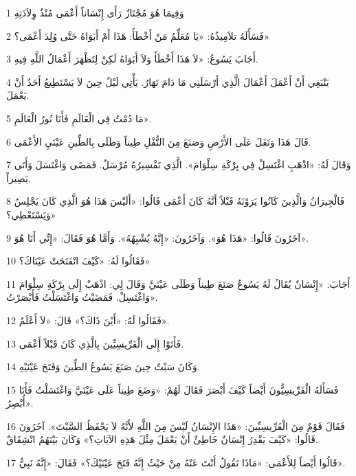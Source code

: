 \par 1 وَفِيمَا هُوَ مُجْتَازٌ رَأَى إِنْسَاناً أَعْمَى مُنْذُ وِلاَدَتِهِ
\par 2 فَسَأَلَهُ تلاَمِيذُهُ: «يَا مُعَلِّمُ مَنْ أَخْطَأَ: هَذَا أَمْ أَبَوَاهُ حَتَّى وُلِدَ أَعْمَى؟»
\par 3 أَجَابَ يَسُوعُ: «لاَ هَذَا أَخْطَأَ وَلاَ أَبَوَاهُ لَكِنْ لِتَظْهَرَ أَعْمَالُ اللَّهِ فِيهِ.
\par 4 يَنْبَغِي أَنْ أَعْمَلَ أَعْمَالَ الَّذِي أَرْسَلَنِي مَا دَامَ نَهَارٌ. يَأْتِي لَيْلٌ حِينَ لاَ يَسْتَطِيعُ أَحَدٌ أَنْ يَعْمَلَ.
\par 5 مَا دُمْتُ فِي الْعَالَمِ فَأَنَا نُورُ الْعَالَمِ».
\par 6 قَالَ هَذَا وَتَفَلَ عَلَى الأَرْضِ وَصَنَعَ مِنَ التُّفْلِ طِيناً وَطَلَى بِالطِّينِ عَيْنَيِ الأَعْمَى.
\par 7 وَقَالَ لَهُ: «اذْهَبِ اغْتَسِلْ فِي بِرْكَةِ سِلْوَامَ». الَّذِي تَفْسِيرُهُ مُرْسَلٌ. فَمَضَى وَاغْتَسَلَ وَأَتَى بَصِيراً.
\par 8 فَالْجِيرَانُ وَالَّذِينَ كَانُوا يَرَوْنَهُ قَبْلاً أَنَّهُ كَانَ أَعْمَى قَالُوا: «أَلَيْسَ هَذَا هُوَ الَّذِي كَانَ يَجْلِسُ وَيَسْتَعْطِي؟»
\par 9 آخَرُونَ قَالُوا: «هَذَا هُوَ». وَآخَرُونَ: «إِنَّهُ يُشْبِهُهُ». وَأَمَّا هُوَ فَقَالَ: «إِنِّي أَنَا هُوَ».
\par 10 فَقَالُوا لَهُ: «كَيْفَ انْفَتَحَتْ عَيْنَاكَ؟»
\par 11 أَجَابَ: «إِنْسَانٌ يُقَالُ لَهُ يَسُوعُ صَنَعَ طِيناً وَطَلَى عَيْنَيَّ وَقَالَ لِي: اذْهَبْ إِلَى بِرْكَةِ سِلْوَامَ وَاغْتَسِلْ. فَمَضَيْتُ وَاغْتَسَلْتُ فَأَبْصَرْتُ».
\par 12 فَقَالُوا لَهُ: «أَيْنَ ذَاكَ؟» قَالَ: «لاَ أَعْلَمُ».
\par 13 فَأَتَوْا إِلَى الْفَرِّيسِيِّينَ بِالَّذِي كَانَ قَبْلاً أَعْمَى.
\par 14 وَكَانَ سَبْتٌ حِينَ صَنَعَ يَسُوعُ الطِّينَ وَفَتَحَ عَيْنَيْهِ.
\par 15 فَسَأَلَهُ الْفَرِّيسِيُّونَ أَيْضاً كَيْفَ أَبْصَرَ فَقَالَ لَهُمْ: «وَضَعَ طِيناً عَلَى عَيْنَيَّ وَاغْتَسَلْتُ فَأَنَا أُبْصِرُ».
\par 16 فَقَالَ قَوْمٌ مِنَ الْفَرِّيسِيِّينَ: «هَذَا الإِنْسَانُ لَيْسَ مِنَ اللَّهِ لأَنَّهُ لاَ يَحْفَظُ السَّبْتَ». آخَرُونَ قَالُوا: «كَيْفَ يَقْدِرُ إِنْسَانٌ خَاطِئٌ أَنْ يَعْمَلَ مِثْلَ هَذِهِ الآيَاتِ؟» وَكَانَ بَيْنَهُمُ انْشِقَاقٌ.
\par 17 قَالُوا أَيْضاً لِلأَعْمَى: «مَاذَا تَقُولُ أَنْتَ عَنْهُ مِنْ حَيْثُ إِنَّهُ فَتَحَ عَيْنَيْكَ؟» فَقَالَ: «إِنَّهُ نَبِيٌّ».
